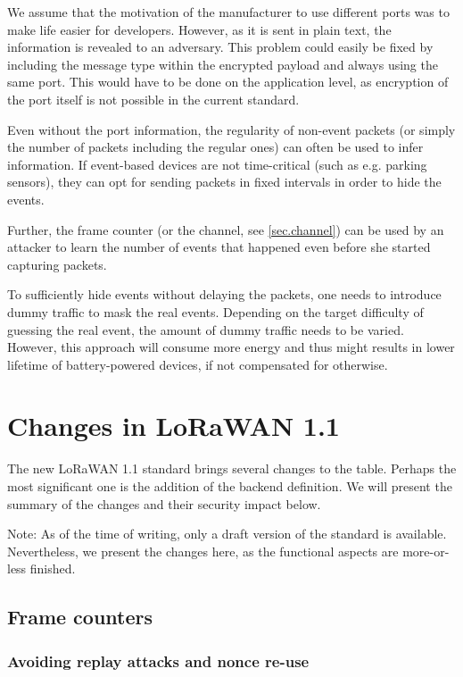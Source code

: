 {We assume that the motivation of the manufacturer to use different
ports was to make life easier for developers. However, as it is sent in
plain text, the information is revealed to an adversary. This
problem could easily be fixed by including the message type within the
encrypted payload and always using the same port. This would have to be
done on the application level, as encryption of the port itself is not
possible in the current standard.}

Even without the port information, the regularity of non-event packets (or simply the number of packets including the regular ones) can often be used to infer information. If event-based devices are not time-critical (such as e.g. parking
sensors), they can opt for sending packets in fixed intervals in order to
hide the events.

Further, the frame counter (or the channel, see \ref{sec.channel}) can be used by an attacker to learn the number of events that happened even before she started capturing packets.

To sufficiently hide events without delaying the packets, one needs to introduce dummy traffic to mask the real events.
Depending on the target difficulty of guessing the real event, the amount of dummy
traffic needs to be varied. However, this approach will consume more energy and thus might
results in lower lifetime of battery-powered devices, if not compensated for otherwise.

\chapter{Changes in LoRaWAN 1.1}\label{h.6snn4dp8j73u}

The new LoRaWAN 1.1 standard brings several changes to the table. Perhaps the most significant one is the addition of the
backend definition. We will present the summary of the changes and their security impact below.

Note: As of the time of writing, only a draft version of the standard is available. Nevertheless, we present the changes here, as the functional aspects are more-or-less finished.

\hypertarget{h.jpbc1i7c9eqd}{\section{\texorpdfstring{{Frame
counters}}{Frame counters}}\label{h.jpbc1i7c9eqd}}

\subsection{Avoiding replay attacks and nonce re-use}

